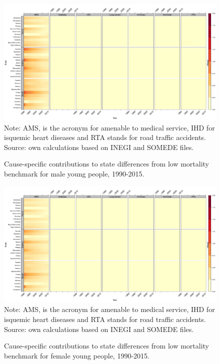 \documentclass[11.5pt]{article}
\begin{document}
{\begin{figure}
\centering
\caption{Cause-specific contributions to state differences from low mortality benchmark for male young people, 1990-2015.}
\label{fig:e0_14_males}
\includegraphics[scale=.3]{Figures/Young_Male_heatmap.pdf}
Note: AMS, is the acronym for amenable to medical service, IHD for isquemic heart diseases and RTA stands for road traffic accidents. Source: own calculations based on INEGI and SOMEDE files. \end{figure}

\begin{figure}
\centering
\caption{Cause-specific contributions to state differences from low mortality benchmark for female young people, 1990-2015.}
\label{fig:e0_14_females}
\includegraphics[scale=.3]{Figures/Young_Female_heatmap.pdf}
Note: AMS, is the acronym for amenable to medical service, IHD for isquemic heart diseases and RTA stands for road traffic accidents. Source: own calculations based on INEGI and SOMEDE files. \end{figure}



}
\end{document}
